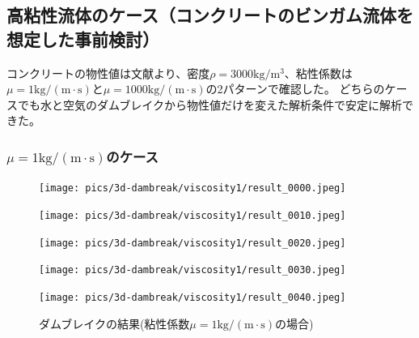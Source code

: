\subsection{高粘性流体のケース（コンクリートのビンガム流体を想定した事前検討）}

コンクリートの物性値は文献\cite{Saito2012}より、密度$\rho=3000\mathrm{kg/m^3}$、粘性係数は$\mu = 1 \mathrm{kg/(m\cdot s)}$と$\mu=1000 \mathrm{kg/(m\cdot s)}$の2パターンで確認した。
どちらのケースでも水と空気のダムブレイクから物性値だけを変えた解析条件で安定に解析できた。

\subsubsection{$\mu = 1 \mathrm{kg/(m\cdot s)}$のケース}
\begin{figure}[H]
	\centering
	\begin{minipage}[b]{0.19\columnwidth}
	    \centering
	    \texttt{[image: pics/3d-dambreak/viscosity1/result\_0000.jpeg]}
	\end{minipage}
	\begin{minipage}[b]{0.19\columnwidth}
	    \centering
	    \texttt{[image: pics/3d-dambreak/viscosity1/result\_0010.jpeg]}
	\end{minipage}
	\begin{minipage}[b]{0.19\columnwidth}
	    \centering
	    \texttt{[image: pics/3d-dambreak/viscosity1/result\_0020.jpeg]}
	\end{minipage}
	\begin{minipage}[b]{0.19\columnwidth}
	    \centering
	    \texttt{[image: pics/3d-dambreak/viscosity1/result\_0030.jpeg]}
	\end{minipage}
	\begin{minipage}[b]{0.19\columnwidth}
	    \centering
	    \texttt{[image: pics/3d-dambreak/viscosity1/result\_0040.jpeg]}
	\end{minipage}
	\caption{ダムブレイクの結果(粘性係数$\mu = 1 \mathrm{kg/(m\cdot s)}$の場合)}
	\label{fig:dambreak-result-visc1}
\end{figure}

